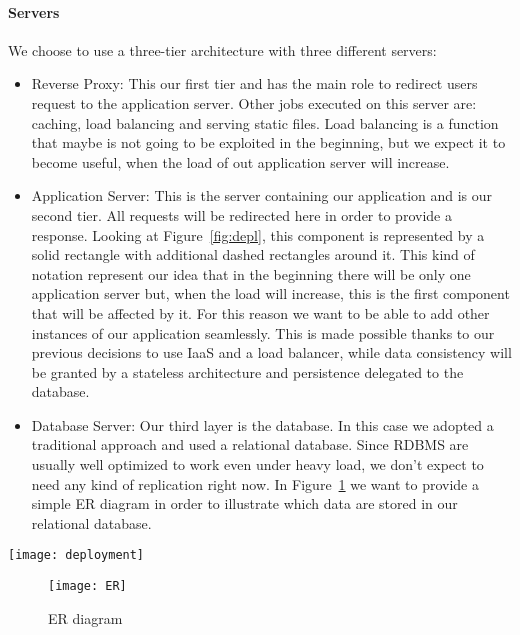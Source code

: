 \paragraph{Servers} We choose to use a three-tier architecture with three different servers:
\begin{itemize}
    \item{Reverse Proxy}: This our first tier and has the main role to redirect users request to
        the application server. Other jobs executed on this server are: caching, load balancing
        and serving static files.
        Load balancing is a function that maybe is not going to be exploited in the beginning,
        but we expect it to become useful, when the load of out application server will increase.

    \item{Application Server}: This is the server containing our application and is our second tier.
        All requests will be redirected here in order to provide a response. Looking at
        Figure~\ref{fig:depl}, this component is represented by a solid rectangle with additional
        dashed rectangles around it. This kind of notation represent our idea that in the
        beginning there will be only one application server but, when the load will increase,
        this is the first component that will be affected by it. For this reason we want to
        be able to add other instances of our application seamlessly. This is made possible
        thanks to our previous decisions to use IaaS and a load balancer, while data consistency
        will be granted by a stateless architecture and persistence delegated to the database.

    \item{Database Server}: Our third layer is the database. In this case we adopted a
        traditional approach and used a relational database. Since RDBMS are usually well
        optimized to work even under heavy load, we don't expect to need any kind of
        replication right now.
        In Figure~\ref{fig:er} we want to provide a simple ER diagram in order to illustrate which data are stored in our relational database.

\end{itemize}
\begin{sidewaysfigure}
\centering
\texttt{[image: deployment]}
\caption{Deployment view}
\label{fig:depl}
\end{sidewaysfigure}

\begin{figure}
	\centering
	\texttt{[image: ER]}
	\caption{ER diagram}
	\label{fig:er}
\end{figure}